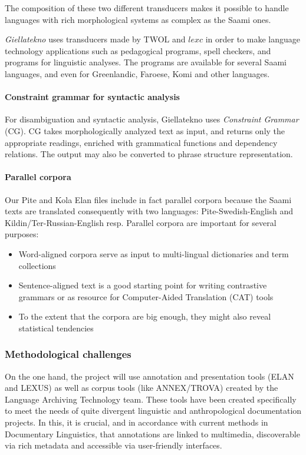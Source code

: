 \documentclass[a4paper,12pt]{article}
\begin{document}
The composition of these two different transducers makes it possible to handle languages with rich morphological systems as complex as the Saami ones. 

\textit{Giellatekno} uses transducers made by TWOL and $lexc$ in order to make language technology applications such as pedagogical programs, spell checkers, and programs for linguistic analyses. The programs are available for several Saami languages, and even for Greenlandic, Faroese, Komi and other languages.

\paragraph{Constraint grammar for syntactic analysis}
For disambiguation and syntactic analysis, Giellatekno uses \textit{Constraint Grammar} (CG). CG takes morphologically analyzed text as input, and returns only the appropriate readings, enriched with grammatical functions and dependency relations. The output may also be converted to phrase structure representation.

\paragraph{Parallel corpora}
Our Pite and Kola Elan files include in fact parallel corpora because the Saami texts are translated consequently with two languages: Pite-Swedish-English and Kildin/Ter-Russian-English resp. Parallel corpora are important for several purposes:
\begin{itemize}
\item Word-aligned corpora serve as input to multi-lingual dictionaries and term collections
\item Sentence-aligned text is a good starting point for writing contrastive grammars or as resource for
Computer-Aided Translation (CAT) tools 
\item To the extent that the corpora are big enough, they might also reveal statistical tendencies
\end{itemize}

\subsubsection{Methodological challenges}
On the one hand, the project will use annotation and presentation tools (ELAN and LEXUS) as well as corpus tools (like ANNEX/TROVA) created by the Language Archiving Technology team. These tools have been created specifically to meet the needs of quite divergent linguistic and anthropological documentation projects. In this, it is crucial, and in accordance with current methods in Documentary Linguistics, that annotations are linked to multimedia, discoverable via rich metadata and accessible via user-friendly interfaces.
\end{document}
